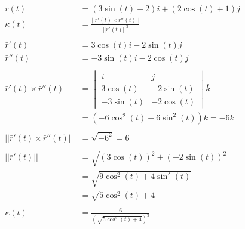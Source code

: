 \documentclass[a4paper,11pt]{article}
\begin{document}
\begin{preview}
\begin{enumerate}
\begin{enumerate}
        \begin{align*}
            \bar{r}(t) &= (3\sin(t) +2)\bar{i} + (2\cos(t)+1)\bar{j}\\
            \kappa(t) &= \frac{|| \bar{r}'(t) \times \bar{r}''(t) ||}{|| \bar{r}'(t) ||^3}\\\\
            \bar{r}'(t) &= 3\cos(t)\bar{i} -2\sin(t)\bar{j}\\
            \bar{r}''(t) &= -3\sin(t)\bar{i} -2\cos(t)\bar{j}\\\\
            \bar{r}'(t) \times \bar{r}''(t) &= 
            \begin{vmatrix}
                \bar{i} & \bar{j} \\
                3\cos(t) & -2\sin(t) \\
                -3\sin(t) & -2\cos(t) 
            \end{vmatrix}\bar{k}\\
            &= \left( -6\cos^2(t) - 6\sin^2(t) \right)\bar{k} = -6\bar{k}\\\\
            || \bar{r}'(t) \times \bar{r}''(t) || &= \sqrt{-6^2} = 6\\\\
            || \bar{r}'(t) || &= \sqrt{(3\cos(t))^2 + (-2\sin(t))^2}\\
            &= \sqrt{9\cos^2(t) + 4\sin^2(t)}\\
            &= \sqrt{5\cos^2(t) + 4} \\\\
            \kappa(t) &= \frac{6}{\left(\sqrt{5\cos^2(t) + 4}\right)^3}
        \end{align*}
        
    \end{enumerate}



\end{enumerate}


\end{preview}
\end{document}
